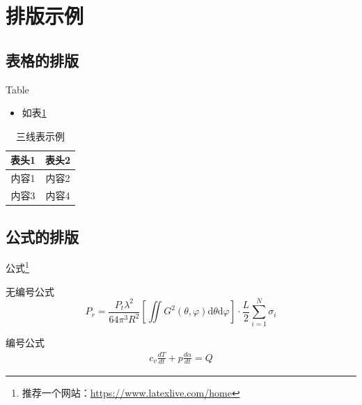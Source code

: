 \documentclass{beamer}
\begin{document}
\section{排版示例}

\subsection{表格的排版}

\begin{frame}{Table}
    \begin{itemize}
        \item 如表\ref{tb:one}
    \end{itemize}
    \begin{table}[h]
        \centering
        \begin{tabular}{cc}
        \toprule%
        表头1&表头2 \\
        \midrule%
        内容1&内容2 \\
        内容3&内容4 \\
        \bottomrule%
        \end{tabular}
        \caption{三线表示例}
        \label{tb:one}
    \end{table}
\end{frame}

\subsection{公式的排版}
\begin{frame}{公式\footnote{推荐一个网站：\url{https://www.latexlive.com/home}}}
    \begin{exampleblock}{无编号公式} %
        \begin{equation*}
            P_{r}=\frac{P_{t} \lambda^{2}}{64 \pi^{3} R^{2}}\left[\iint G^{2}(\theta, \varphi) \mathrm{d} \theta \mathrm{d} \varphi\right] \cdot \frac{L}{2} \sum_{i=1}^{N} \sigma_{i}
        \end{equation*}
    \end{exampleblock}
    \begin{exampleblock}{编号公式}
        \begin{align}
            c_{v} \frac{d T}{d t}+p \frac{d \alpha}{d t}=Q
        \end{align}
    \end{exampleblock}
\end{frame}
\end{document}
